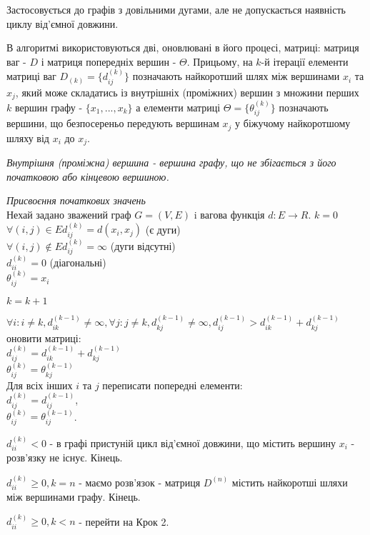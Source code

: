 \documentclass[12pt,a4paper]{book}
\newenvironment{slim_enumerate}{
\begin{enumerate}
  \setlength{\itemsep}{1pt}
  \setlength{\parskip}{0pt}
  \setlength{\parsep}{0pt}}
{\end{enumerate}}
\begin{document}
Застосовується до графів з довільними дугами, але не допускається наявність циклу від’ємної довжини.

В алгоритмі використовуються дві, оновлювані в його процесі, матриці: матриця ваг - $D$ і матриця попередніх вершин - $\Theta$. Прицьому, на $k$-й ітерації елементи матриці ваг $D_{(k)}=\{d_{ij}^{(k)}\}$ позначають найкоротший шлях між вершинами $x_i$ та $x_j$, який може складатись із внутрішніх (проміжних) вершин з множини перших $k$ вершин графу - $\{x_1, ..., x_k\}$ а елементи матриці $\Theta=\{\theta_{ij}^{(k)}\}$ позначають вершини, що безпосереньо передують вершинам $x_j$ у біжучому найкоротшому шляху від $x_i$ до $x_j$.

\emph{Внутрішня (проміжна) вершина - вершина графу, що не збігається з його початковою або кінцевою вершиною.}

\begin{slim_enumerate}
  \item \emph{Присвоєння початкових значень}\\
Нехай задано зважений граф $G=(V,E)$ i вагова функція $d:E \rightarrow R$.
$k=0$\\
$\forall (i,j) \in E d_{ij}^{(k)}=d(x_i,x_j)$ (є дуги)\\
$\forall (i,j) \notin E d_{ij}^{(k)}=\infty$ (дуги відсутні)\\
$d_{ii}^{(k)}=0$ (діагональні)\\
$\theta_{ij}^{(k)}=x_i$
  \item $k=k+1$
  \item $\forall i: i \neq k, d_{ik}^{(k-1)} \neq \infty, \forall j: j \neq k, d_{kj}^{(k-1)} \neq \infty, d_{ij}^{(k-1)}>d_{ik}^{(k-1)}+d_{kj}^{(k-1)}$ оновити матриці:\\
$d_{ij}^{(k)}=d_{ik}^{(k-1)}+d_{kj}^{(k-1)}$\\
$\theta_{ij}^{(k)}=\theta_{kj}^{(k-1)}$\\
Для всіх інших $i$ та $j$ переписати попередні елементи:\\
$d_{ij}^{(k)}=d_{ij}^{(k-1)}$,\\
$\theta_{ij}^{(k)}=\theta_{ij}^{(k-1)}$.
  \item 
    \begin{slim_enumerate}
      \item $d_{ii}^{(k)} < 0$ - в графі пристуній цикл від’ємної довжини, що містить вершину $x_i$ - розв’язку не існує. Кінець.
      \item $d_{ii}^{(k)} \geq 0, k=n$ - маємо розв’язок - матриця $D^{(n)}$ містить найкоротші шляхи між вершинами графу. Кінець.
      \item $d_{ii}^{(k)} \geq 0, k<n$ - перейти на Крок 2.
    \end{slim_enumerate}
\end{slim_enumerate}
\end{document}
